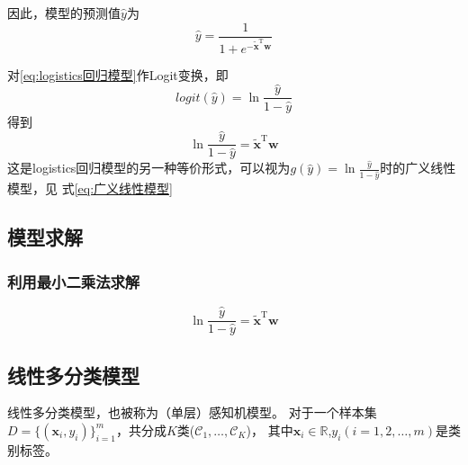 \documentclass[withoutpreface,bwprint]{NoteBook}
\begin{document}
因此，模型的预测值$\hat{y}$为
\begin{equation}
    \hat{y}= \frac{1}{1+e^{-\tilde{\mathbf{x}}^\mathrm{T} \mathbf{w}}}
\end{equation}

对\cref{eq:logistics回归模型}作Logit变换，即
$$
logit(\hat{y}) = \ln{\frac{\hat{y}}{1-\hat{y}}} 
$$
得到
\begin{equation}
    \label{eq:logistics回归模型形式2}
    \ln{\frac{\hat{y}}{1-\hat{y}}} = \tilde{\mathbf{x}}^\mathrm{T} \mathbf{w}
\end{equation}
这是logistics回归模型的另一种等价形式，可以视为$g(\hat{y})=\ln{\frac{\hat{y}}{1-\hat{y}}} $时的广义线性模型，见
式\cref{eq:广义线性模型}

\subsection{模型求解}
\subsubsection{利用最小二乘法求解}

\begin{equation}
    \ln{\frac{\hat{y}}{1-\hat{y}}} = \tilde{\mathbf{x}}^\mathrm{T} \mathbf{w}
\end{equation}


\subsection{线性多分类模型}
线性多分类模型，也被称为（单层）感知机模型。
对于一个样本集 $ D = \{(\mathbf{x}_i, y_i)\}_{i=1}^m$，共分成$K$类($\mathcal{C}_1,\dots, \mathcal{C}_K$)， 
其中$\mathbf{x}_i \in \mathbb{R}$,$y_i (i=1,2, \dots, m)$是类别标签。
\end{document}
